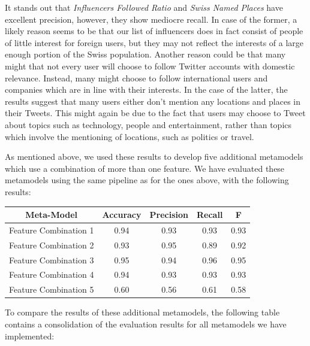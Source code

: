 \documentclass[10pt,a4paper]{article}
\begin{document}
It stands out that \textit{Influencers Followed Ratio} and \textit{Swiss Named Places} have excellent precision, however, they show mediocre recall. In case of the former, a likely reason seems to be that our list of influencers does in fact consist of people of little interest for foreign users, but they may not reflect the interests of a large enough portion of the Swiss population. Another reason could be that many might that not every user will choose to follow Twitter accounts with domestic relevance. Instead, many might choose to follow international users and companies which are in line with their interests. In the case of the latter, the results suggest that many  users either don't mention any locations and places in their Tweets. This might again be due to the fact that users may choose to Tweet about topics such as technology, people and entertainment, rather than topics which involve the mentioning of locations, such as politics or travel.

As mentioned above, we used these results to develop five additional metamodels which use a combination of more than one feature. We have evaluated these metamodels using the same pipeline as for the ones above, with the following results:

\begin{center}
\begin{tabular}{ |c|c|c|c|c| }
\hline
\textbf{Meta-Model} & \textbf{Accuracy} & \textbf{Precision} & \textbf{Recall} & \textbf{F} \\
\hline
Feature Combination 1 & 0.94 & 0.93 & 0.93 & 0.93 \\
\hline
Feature Combination 2 & 0.93 & 0.95 & 0.89 & 0.92 \\
\hline
Feature Combination 3 & 0.95 & 0.94 & 0.96 & 0.95 \\
\hline
Feature Combination 4 & 0.94 & 0.93 & 0.93 & 0.93 \\
\hline
Feature Combination 5 & 0.60 & 0.56 & 0.61 & 0.58 \\
\hline
\end{tabular}
\end{center}

To compare the results of these additional metamodels, the following table contains a consolidation of the evaluation results for all metamodels we have implemented:
\end{document}
